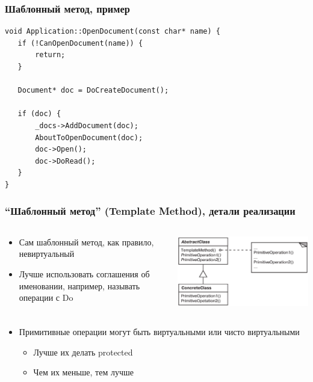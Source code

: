 \documentclass[xetex,mathserif,serif]{beamer}
\begin{document}
    \begin{frame}[fragile]
        \frametitle{Шаблонный метод, пример}
        \begin{verbatim}
void Application::OpenDocument(const char* name) {
   if (!CanOpenDocument(name)) {
       return;
   }

   Document* doc = DoCreateDocument();
  
   if (doc) {
       _docs->AddDocument(doc);
       AboutToOpenDocument(doc);
       doc->Open();
       doc->DoRead();
   }
}
        \end{verbatim}
    \end{frame}

    \begin{frame}
        \frametitle{``Шаблонный метод'' (Template Method), детали реализации}
        \begin{columns}
            \begin{column}{0.5\textwidth}
                \begin{itemize}
                    \item Сам шаблонный метод, как правило, невиртуальный
                    \item Лучше использовать соглашения об именовании, например, называть операции с Do
                \end{itemize}
            \end{column}
            \begin{column}{0.4\textwidth}
                \begin{center}
                    \includegraphics[width=\textwidth]{templateMethod.png}
                \end{center}
            \end{column}
        \end{columns}
        \begin{itemize}
            \item Примитивные операции могут быть виртуальными или чисто виртуальными
            \begin{itemize}
                \item Лучше их делать protected
                \item Чем их меньше, тем лучше
            \end{itemize}
        \end{itemize}
    \end{frame}
\end{document}
